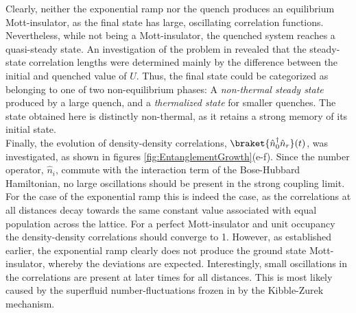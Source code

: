 Clearly, neither the exponential ramp nor the quench produces an equilibrium Mott-insulator, as the final state has large, oscillating correlation functions. Nevertheless, while not being a Mott-insulator, the quenched system reaches a quasi-steady state. An investigation of the problem in \cite{Kollath2007} revealed that the steady-state correlation lengths were determined mainly by the difference between the initial and quenched value of $U$. Thus, the final state could be categorized as belonging to one of two non-equilibrium phases: A \textit{non-thermal steady state} produced by a large quench, and a \textit{thermalized state} for smaller quenches. The state obtained here is distinctly non-thermal, as it retains a strong memory of its initial state.\\

Finally, the evolution of density-density correlations, $\braket{\hat{n}_{0}^{\dag} \hat{n}_{r}}(t)$, was investigated, as shown in figures \ref{fig:EntanglementGrowth}(e-f). Since the number operator, $\hat{n}_i$, commute with the interaction term of the Bose-Hubbard Hamiltonian, no large oscillations should be present in the strong coupling limit. For the case of the exponential ramp this is indeed the case, as the correlations at all distances decay towards the same constant value associated with equal population across the lattice. For a perfect Mott-insulator and unit occupancy the density-density correlations should converge to 1. However, as established earlier, the exponential ramp clearly does not produce the ground state Mott-insulator, whereby the deviations are expected. Interestingly, small oscillations in the correlations are present at later times for all distances. This is most likely caused by the superfluid number-fluctuations frozen in by the Kibble-Zurek mechanism.

